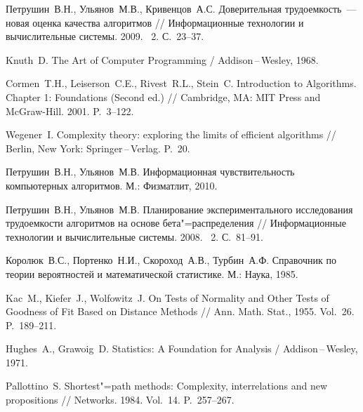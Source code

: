 \documentclass[a4paper, article, 12pt]{extarticle}
\newcommand*{\No}{\textnumero}
\begin{document}
\begin{thebibliography}{1}\label{sec:sources}
	 Петрушин~В.\:Н., Ульянов~М.\:В., Кривенцов~А.\:С. Доверительная трудоемкость~--- новая оценка качества алгоритмов // Информационные технологии и вычислительные системы. 2009. \No~2. С.~23--37.

	 Knuth~D. The Art of Computer Programming / Addison\,--\,Wesley, 1968.

	 Cormen~T.\:H., Leiserson~C.\:E., Rivest~R.\:L., Stein~C. Introduction to Algorithms. Chapter 1: Foundations (Second ed.) // Cambridge, MA: MIT Press and McGraw-Hill. 2001. P.~3--122.

	 Wegener~I. Complexity theory: exploring the limits of efficient algorithms // Berlin, New York: Springer\,--\,Verlag. P.~20.

	 Петрушин~В.\:Н., Ульянов~М.\:В. Информационная чувствительность компьютерных алгоритмов. М.: Физматлит, 2010.

	 Петрушин~В.\:Н., Ульянов~М.\:В. Планирование экспериментального исследования трудоемкости алгоритмов на основе бета"=распределения // Информационные технологии и вычислительные системы. 2008. \No~2. С.~81--91.

	 Королюк~В.\:С., Портенко~Н.\:И., Скороход~А.\:В., Турбин~А.\:Ф. Справочник по теории вероятностей и математической статистике. М.: Наука, 1985.

	 Kac~M., Kiefer~J., Wolfowitz~J. On Tests of Normality and Other Tests of Goodness of Fit Based on Distance Methods // Ann. Math. Stat., 1955. Vol.~26. P.~189--211.

	 Hughes~A., Grawoig~D. Statistics: A Foundation for Analysis / Addison\,--\,Wesley, 1971.

	 Pallottino~S. Shortest"=path methods: Complexity, interrelations and new propositions // Networks. 1984. Vol.~14. P.~257--267.

\end{thebibliography}
\end{document}
